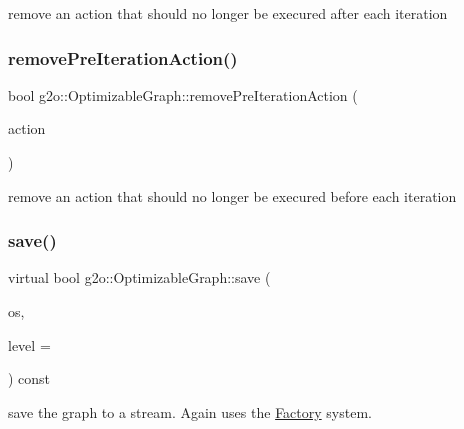 remove an action that should no longer be execured after each iteration 

\mbox{\label{structg2o_1_1_optimizable_graph_a27f5ee7016b20bc6def24a2726fc824b}} 
\subsubsection{\texorpdfstring{remove\+Pre\+Iteration\+Action()}{removePreIterationAction()}}
{\footnotesize\ttfamily bool g2o\+::\+Optimizable\+Graph\+::remove\+Pre\+Iteration\+Action (\begin{DoxyParamCaption}\item[{\mbox{\hyperlink{classg2o_1_1_hyper_graph_action}{Hyper\+Graph\+Action}} $\ast$}]{action }\end{DoxyParamCaption})}



remove an action that should no longer be execured before each iteration 

\mbox{\label{structg2o_1_1_optimizable_graph_abee0b60ade0644904a489564def8ad1d}} 
\subsubsection{\texorpdfstring{save()}{save()}\hspace{0.1cm}{\footnotesize\ttfamily [1/2]}}
{\footnotesize\ttfamily virtual bool g2o\+::\+Optimizable\+Graph\+::save (\begin{DoxyParamCaption}\item[{std\+::ostream \&}]{os,  }\item[{int}]{level = {} }\end{DoxyParamCaption}) const\hspace{0.3cm}{\ttfamily [virtual]}}



save the graph to a stream. Again uses the \mbox{\hyperlink{classg2o_1_1_factory}{Factory}} system. 

